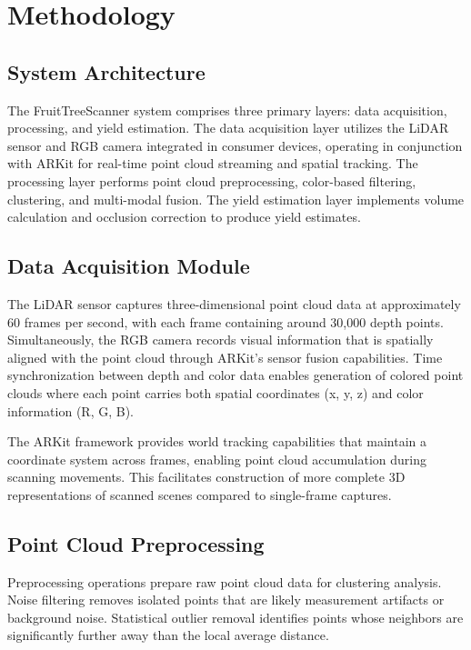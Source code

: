 \section{Methodology}
\label{sec:methodology}

\subsection{System Architecture}
The FruitTreeScanner system comprises three primary layers: data acquisition, processing, and yield estimation. The data acquisition layer utilizes the LiDAR sensor and RGB camera integrated in consumer devices, operating in conjunction with ARKit for real-time point cloud streaming and spatial tracking. The processing layer performs point cloud preprocessing, color-based filtering, clustering, and multi-modal fusion. The yield estimation layer implements volume calculation and occlusion correction to produce yield estimates.

\subsection{Data Acquisition Module}
The LiDAR sensor captures three-dimensional point cloud data at approximately 60 frames per second, with each frame containing around 30,000 depth points. Simultaneously, the RGB camera records visual information that is spatially aligned with the point cloud through ARKit's sensor fusion capabilities. Time synchronization between depth and color data enables generation of colored point clouds where each point carries both spatial coordinates (x, y, z) and color information (R, G, B).

The ARKit framework provides world tracking capabilities that maintain a coordinate system across frames, enabling point cloud accumulation during scanning movements. This facilitates construction of more complete 3D representations of scanned scenes compared to single-frame captures.

\subsection{Point Cloud Preprocessing}
Preprocessing operations prepare raw point cloud data for clustering analysis. Noise filtering removes isolated points that are likely measurement artifacts or background noise. Statistical outlier removal identifies points whose neighbors are significantly further away than the local average distance.


